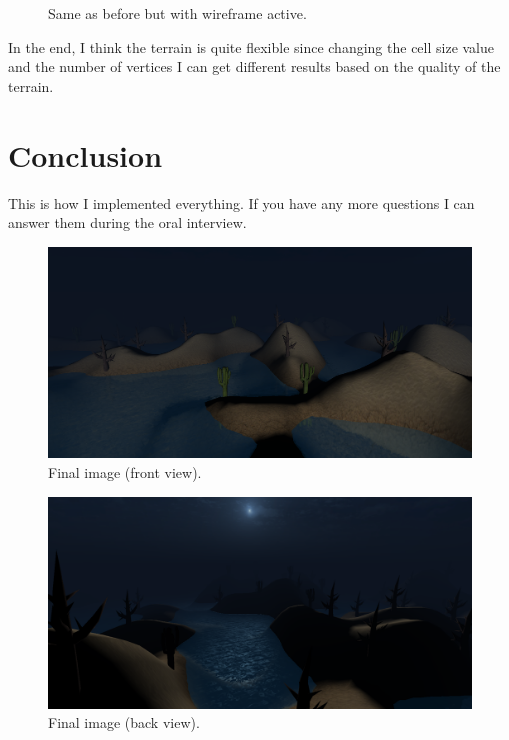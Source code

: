 \newpage

\begin{figure}[hbt!]
	\centering
	
	\noindent{}
	
	\caption{Same as before but with wireframe active.}
\end{figure} 

\noindent
In the end, I think the terrain is quite flexible since changing the cell size value and the number of vertices I can get different results based on the quality of the terrain.

\newpage

\section{Conclusion}
This is how I implemented everything. If you have any more questions I can answer them during the oral interview.


\begin{figure}[hbt!]
	\centering
	\includegraphics[width= 1
	\textwidth]{images/final1.png}
	\caption{Final image (front view).}
\end{figure}


\begin{figure}[hbt!]
	\centering
	\includegraphics[width= 1
	\textwidth]{images/final2.png}
	\caption{Final image (back view).}
\end{figure}
